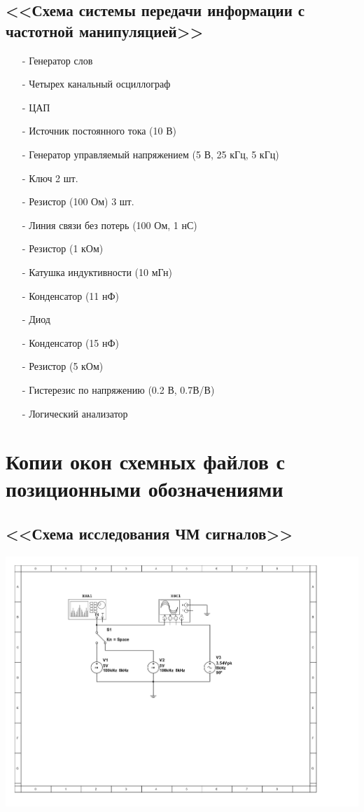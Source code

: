 \documentclass[11pt]{article}
\begin{document}
\subsection{<<Схема системы передачи информации с частотной манипуляцией>>}
\begin{itemize}
    \item[-] Генератор слов 
    \item[-] Четырех канальный осциллограф
    \item[-] ЦАП
    \item[-] Источник постоянного тока (10 В)
    \item[-] Генератор управляемый напряжением (5 В, 25 кГц, 5 кГц)
    \item[-] Ключ 2 шт.
    \item[-] Резистор (100 Ом) 3 шт.
    \item[-] Линия связи без потерь (100 Ом, 1 нС)
    \item[-] Резистор (1 кОм)
    \item[-] Катушка индуктивности (10 мГн)
    \item[-] Конденсатор (11 нФ)
    \item[-] Диод
    \item[-] Конденсатор (15 нФ)
    \item[-] Резистор (5 кОм)
    \item[-] Гистерезис по напряжению (0.2 В, 0.7В/В)
    \item[-] Логический анализатор
\end{itemize}
\section{Копии окон схемных файлов с позиционными
обозначениями}
\subsection{<<Схема исследования ЧМ сигналов>>}
\includegraphics[width=1\linewidth]{img/1/scheme.jpg}
\end{document}
